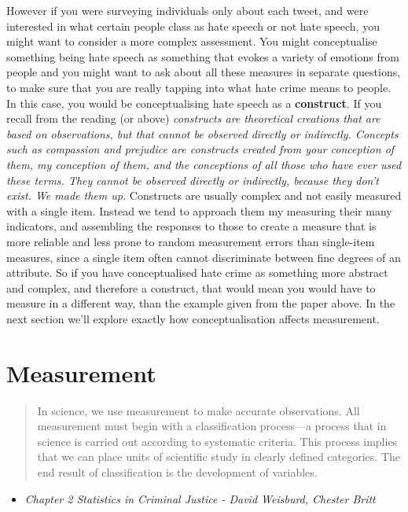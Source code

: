 \documentclass[
]{book}
\providecommand{\tightlist}{%
  \setlength{\itemsep}{0pt}\setlength{\parskip}{0pt}}
\begin{document}
However if you were surveying individuals only about each tweet, and were interested in what certain people class as hate speech or not hate speech, you might want to consider a more complex assessment. You might conceptualise something being hate speech as something that evokes a variety of emotions from people and you might want to ask about all these measures in separate questions, to make sure that you are really tapping into what hate crime means to people. In this case, you would be conceptualising hate speech as a \textbf{construct}. If you recall from the reading (or above) \emph{constructs are theoretical creations that are based on observations, but that cannot be observed directly or indirectly. Concepts such as compassion and prejudice are constructs created from your conception of them, my conception of them, and the conceptions of all those who have ever used these terms. They cannot be observed directly or indirectly, because they don't exist. We made them up.} Constructs are usually complex and not easily measured with a single item. Instead we tend to approach them my measuring their many indicators, and assembling the responses to those to create a measure that is more reliable and less prone to random measurement errors than single-item measures, since a single item often cannot discriminate between fine degrees of an attribute. So if you have conceptualised hate crime as something more abstract and complex, and therefore a construct, that would mean you would have to measure in a different way, than the example given from the paper above. In the next section we'll explore exactly how conceptualisation affects measurement.

\hypertarget{measurement}{%
\section{Measurement}\label{measurement}}

\begin{quote}
In science, we use measurement to make accurate observations. All measurement must begin with a classification process---a process that in science is carried out according to systematic criteria. This process implies that we can place units of scientific study in clearly defined categories. The end result of classification is the development of variables.
\end{quote}

\begin{itemize}
\tightlist
\item
  \emph{Chapter 2 Statistics in Criminal Justice - David Weisburd, Chester Britt}
\end{itemize}
\end{document}
